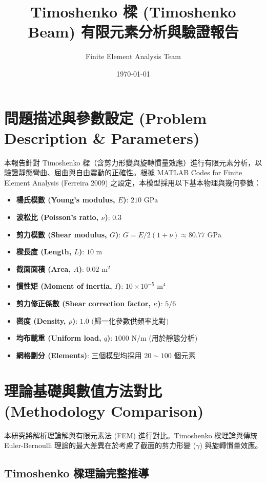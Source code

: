 ﻿\documentclass[UTF8, a4paper, 12pt]{ctexart}
\title{\textbf{Timoshenko 樑 (Timoshenko Beam) 有限元素分析與驗證報告}}
\author{Finite Element Analysis Team}
\date{\today}
\begin{document}
\maketitle

\section{問題描述與參數設定 (Problem Description \& Parameters)}

本報告針對 Timoshenko 樑（含剪力形變與旋轉慣量效應）進行有限元素分析，以驗證靜態彎曲、屈曲與自由震動的正確性。根據 MATLAB Codes for Finite Element Analysis (Ferreira 2009) 之設定，本模型採用以下基本物理與幾何參數：

\begin{itemize}
  \item \textbf{楊氏模數 (Young's modulus, $E$)}: $210 \text{ GPa}$
  \item \textbf{波松比 (Poisson's ratio, $\nu$)}: $0.3$
  \item \textbf{剪力模數 (Shear modulus, $G$)}: $G = E / 2(1+\nu) \approx 80.77 \text{ GPa}$
  \item \textbf{樑長度 (Length, $L$)}: $10 \text{ m}$
  \item \textbf{截面面積 (Area, $A$)}: $0.02 \text{ m}^2$
  \item \textbf{慣性矩 (Moment of inertia, $I$)}: $10 \times 10^{-5} \text{ m}^4$
  \item \textbf{剪力修正係數 (Shear correction factor, $\kappa$)}: $5/6$
  \item \textbf{密度 (Density, $\rho$)}: $1.0\text{ (歸一化參數供頻率比對)}$
  \item \textbf{均布載重 (Uniform load, $q$)}: $1000 \text{ N/m}$ (用於靜態分析)
  \item \textbf{網格劃分 (Elements)}: 三個模型均採用 $20\sim100$ 個元素
\end{itemize}

\section{理論基礎與數值方法對比 (Methodology Comparison)}

本研究將解析理論解與有限元素法 (FEM) 進行對比。Timoshenko 樑理論與傳統 Euler-Bernoulli 理論的最大差異在於考慮了截面的剪力形變 ($\gamma$) 與旋轉慣量效應。

\subsection{Timoshenko 樑理論完整推導}
\end{document}
